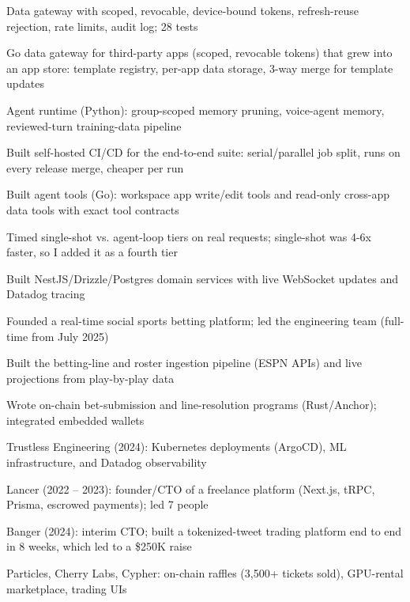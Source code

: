 \documentclass[print]{jack-resume}
\begin{document}
\begin{tightemize}
    \item Data gateway with scoped, revocable, device-bound tokens, refresh-reuse rejection, rate limits, audit log; 28 tests
    \item Go data gateway for third-party apps (scoped, revocable tokens) that grew into an app store: template registry, per-app data storage, 3-way merge for template updates
    \item Agent runtime (Python): group-scoped memory pruning, voice-agent memory, reviewed-turn training-data pipeline
    \item Built self-hosted CI/CD for the end-to-end suite: serial/parallel job split, runs on every release merge, cheaper per run
    \item Built agent tools (Go): workspace app write/edit tools and read-only cross-app data tools with exact tool contracts
    \item Timed single-shot vs. agent-loop tiers on real requests; single-shot was 4-6x faster, so I added it as a fourth tier
\end{tightemize}
\sectionsep

\begin{tightemize}
    \item Built NestJS/Drizzle/Postgres domain services with live WebSocket updates and Datadog tracing
    \item Founded a real-time social sports betting platform; led the engineering team (full-time from July 2025)
    \item Built the betting-line and roster ingestion pipeline (ESPN APIs) and live projections from play-by-play data
    \item Wrote on-chain bet-submission and line-resolution programs (Rust/Anchor); integrated embedded wallets
\end{tightemize}
\sectionsep

\begin{tightemize}
    \item Trustless Engineering (2024): Kubernetes deployments (ArgoCD), ML infrastructure, and Datadog observability
    \item Lancer (2022 – 2023): founder/CTO of a freelance platform (Next.js, tRPC, Prisma, escrowed payments); led 7 people
    \item Banger (2024): interim CTO; built a tokenized-tweet trading platform end to end in 8 weeks, which led to a \$250K raise
    \item Particles, Cherry Labs, Cypher: on-chain raffles (3,500+ tickets sold), GPU-rental marketplace, trading UIs
\end{tightemize}
\sectionsep
\end{document}

